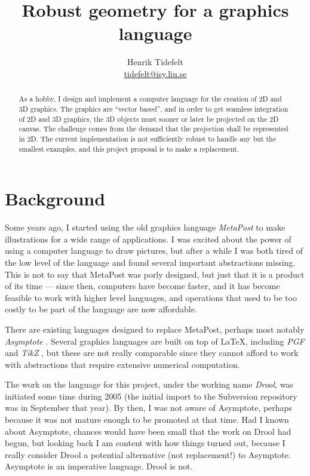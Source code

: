 \documentclass[a4paper]{article}
\title{Robust geometry for a graphics language}
\author{Henrik Tidefelt\\
\href{mailto:tidefelt@isy.liu.se}{\url{tidefelt@isy.liu.se}}}
\begin{document}
\maketitle

\begin{abstract}
  As a hobby, I design and implement a computer language for the creation of 2D and 3D graphics.  The graphics are ``vector based'', and in order to get seamless integration of 2D and 3D graphics, the 3D objects must sooner or later be projected on the 2D canvas.  The challenge comes from the demand that the projection shall be represented in 2D.  The current implementation is not sufficiently robust to handle any but the smallest examples, and this project proposal is to make a replacement.
\end{abstract}

\section*{Background}%
%
Some years ago, I started using the old graphics language \emph{MetaPost} \citep{Hobby94MetaPost} to make illustrations for a wide range of applications.  I was excited about the power of using a computer language to draw pictures, but after a while I was both tired of the low level of the language and found several important abstractions missing.  This is not to say that MetaPost was porly designed, but just that it is a product of its time --- since then, computers have become faster, and it has become feasible to work with higher level languages, and operations that used to be too costly to be part of the language are now affordable.

There are existing languages designed to replace MetaPost, perhaps most notably \emph{Asymptote} \citep{Asymptote_1.29}.  Several graphics languages are built on top of \LaTeX{}, including \emph{PGF} and \emph{TikZ} \citep{TikZ_PGF_1.00}, but these are not really comparable since they cannot afford to work with abstractions that require extensive numerical computation.

The work on the language for this project, under the working name \emph{Drool}, was initiated some time during 2005 (the initial import to the Subversion repository was in September that year).  By then, I was not aware of Asymptote, perhaps because it was not mature enough to be promoted at that time.  Had I known about Asymptote, chances would have been small that the work on Drool had begun, but looking back I am content with how things turned out, because I really consider Drool a potential alternative (not replacement!) to Asymptote.  Asymptote is an imperative language.  Drool is not.
\end{document}
